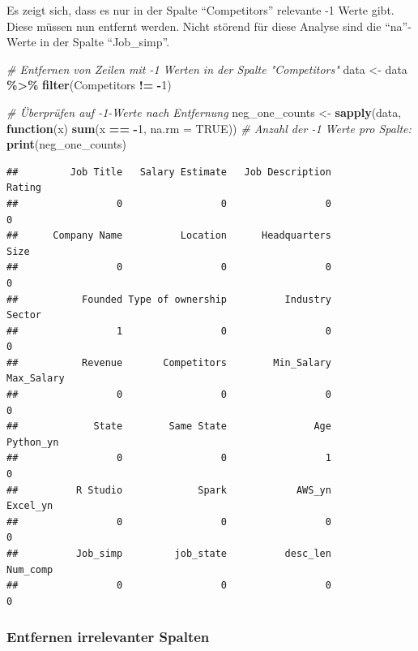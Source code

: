 \documentclass[
]{article}
\newenvironment{Shaded}{\begin{snugshade}}{\end{snugshade}}
\newcommand{\AttributeTok}[1]{\textcolor[rgb]{0.13,0.29,0.53}{#1}}
\newcommand{\CommentTok}[1]{\textcolor[rgb]{0.56,0.35,0.01}{\textit{#1}}}
\newcommand{\ConstantTok}[1]{\textcolor[rgb]{0.56,0.35,0.01}{#1}}
\newcommand{\ControlFlowTok}[1]{\textcolor[rgb]{0.13,0.29,0.53}{\textbf{#1}}}
\newcommand{\DecValTok}[1]{\textcolor[rgb]{0.00,0.00,0.81}{#1}}
\newcommand{\FunctionTok}[1]{\textcolor[rgb]{0.13,0.29,0.53}{\textbf{#1}}}
\newcommand{\NormalTok}[1]{#1}
\newcommand{\OtherTok}[1]{\textcolor[rgb]{0.56,0.35,0.01}{#1}}
\newcommand{\SpecialCharTok}[1]{\textcolor[rgb]{0.81,0.36,0.00}{\textbf{#1}}}
\begin{document}
Es zeigt sich, dass es nur in der Spalte ``Competitors'' relevante -1
Werte gibt. Diese müssen nun entfernt werden. Nicht störend für diese
Analyse sind die ``na''-Werte in der Spalte ``Job\_simp''.

\begin{Shaded}
\begin{Highlighting}[]
\CommentTok{\# Entfernen von Zeilen mit {-}1 Werten in der Spalte "Competitors"}
\NormalTok{data }\OtherTok{\textless{}{-}}\NormalTok{ data }\SpecialCharTok{\%\textgreater{}\%}
  \FunctionTok{filter}\NormalTok{(Competitors }\SpecialCharTok{!=} \SpecialCharTok{{-}}\DecValTok{1}\NormalTok{)}

\CommentTok{\# Überprüfen auf {-}1{-}Werte nach Entfernung}
\NormalTok{neg\_one\_counts }\OtherTok{\textless{}{-}} \FunctionTok{sapply}\NormalTok{(data, }\ControlFlowTok{function}\NormalTok{(x) }\FunctionTok{sum}\NormalTok{(x }\SpecialCharTok{==} \SpecialCharTok{{-}}\DecValTok{1}\NormalTok{, }\AttributeTok{na.rm =} \ConstantTok{TRUE}\NormalTok{))}
\CommentTok{\# Anzahl der {-}1 Werte pro Spalte:}
\FunctionTok{print}\NormalTok{(neg\_one\_counts)}
\end{Highlighting}
\end{Shaded}

\begin{verbatim}
##         Job Title   Salary Estimate   Job Description            Rating 
##                 0                 0                 0                 0 
##      Company Name          Location      Headquarters              Size 
##                 0                 0                 0                 0 
##           Founded Type of ownership          Industry            Sector 
##                 1                 0                 0                 0 
##           Revenue       Competitors        Min_Salary        Max_Salary 
##                 0                 0                 0                 0 
##             State        Same State               Age         Python_yn 
##                 0                 0                 1                 0 
##          R Studio             Spark            AWS_yn          Excel_yn 
##                 0                 0                 0                 0 
##          Job_simp         job_state          desc_len          Num_comp 
##                 0                 0                 0                 0
\end{verbatim}

\subsubsection{Entfernen irrelevanter
Spalten}\label{entfernen-irrelevanter-spalten}
\end{document}
